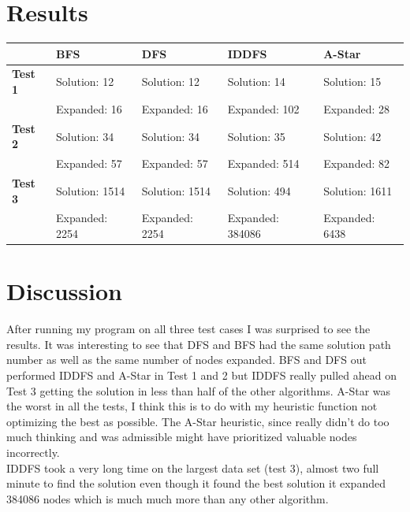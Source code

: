 \documentclass[letterpaper,11pt,notitlepage,fleqn]{article}
\begin{document}
\section{Results}
\begin{center}
    \begin{tabular}{|l|l|l|l|l|}
        \hline
        & \textbf{BFS} & \textbf{DFS} & \textbf{IDDFS} & \textbf{A-Star} \\ \hline
        \textbf{Test 1} & Solution: 12 & Solution: 12 & Solution: 14 & Solution: 15 \\
        & Expanded: 16 & Expanded: 16 & Expanded: 102 & Expanded: 28 \\ \hline
        \textbf{Test 2} & Solution: 34 & Solution: 34 & Solution: 35 & Solution: 42 \\
        & Expanded: 57 & Expanded: 57 & Expanded: 514 & Expanded: 82 \\ \hline
        \textbf{Test 3} & Solution: 1514 & Solution: 1514 & Solution: 494 & Solution: 1611 \\
        & Expanded: 2254 & Expanded: 2254 & Expanded: 384086 & Expanded: 6438 \\ \hline
    \end{tabular}
\end{center}

\section{Discussion}
After running my program on all three test cases I was surprised to see the results. It was interesting to see that DFS and BFS had the same solution path number as well as the same number of nodes expanded. BFS and DFS out performed IDDFS and A-Star in Test 1 and 2 but IDDFS really pulled ahead on Test 3 getting the solution in less than half of the other algorithms. A-Star was the worst in all the tests, I think this is to do with my heuristic function not optimizing the
best as possible. The A-Star heuristic, since really didn't do too much thinking and was admissible might have prioritized valuable nodes incorrectly. 
\\
\indent IDDFS took a very long time on the largest data set (test 3), almost two full minute to find the solution even though it found the best solution it expanded 384086 nodes which is much much more than any other algorithm.
\end{document}
